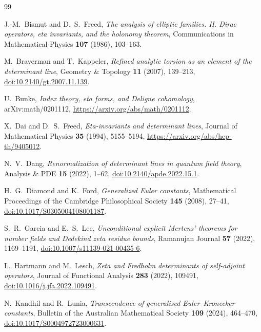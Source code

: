 \documentclass[11pt]{article}
\theoremstyle{definition}
\theoremstyle{remark}
\begin{document}
\begin{thebibliography}{99}

J.-M.~Bismut and D.~S.~Freed,
\emph{The analysis of elliptic families. II. Dirac operators, eta invariants, and the holonomy
theorem},
Communications in Mathematical Physics \textbf{107} (1986), 103--163.

M.~Braverman and T.~Kappeler,
\emph{Refined analytic torsion as an element of the determinant line},
Geometry \& Topology \textbf{11} (2007), 139--213,
\href{https://doi.org/10.2140/gt.2007.11.139}{doi:10.2140/gt.2007.11.139}.

U.~Bunke,
\emph{Index theory, eta forms, and Deligne cohomology},
arXiv:math/0201112,
\url{https://arxiv.org/abs/math/0201112}.

X.~Dai and D.~S.~Freed,
\emph{Eta-invariants and determinant lines},
Journal of Mathematical Physics \textbf{35} (1994), 5155--5194,
\url{https://arxiv.org/abs/hep-th/9405012}.

N.~V.~Dang,
\emph{Renormalization of determinant lines in quantum field theory},
Analysis \& PDE \textbf{15} (2022), 1--62,
\href{https://doi.org/10.2140/apde.2022.15.1}{doi:10.2140/apde.2022.15.1}.

H.~G.~Diamond and K.~Ford,
\emph{Generalized Euler constants},
Mathematical Proceedings of the Cambridge Philosophical Society \textbf{145} (2008), 27--41,
\href{https://doi.org/10.1017/S0305004108001187}{doi:10.1017/S0305004108001187}.

S.~R.~Garcia and E.~S.~Lee,
\emph{Unconditional explicit Mertens' theorems for number fields and Dedekind zeta residue bounds},
Ramanujan Journal \textbf{57} (2022), 1169--1191,
\href{https://doi.org/10.1007/s11139-021-00435-6}{doi:10.1007/s11139-021-00435-6}.

L.~Hartmann and M.~Lesch,
\emph{Zeta and Fredholm determinants of self-adjoint operators},
Journal of Functional Analysis \textbf{283} (2022), 109491,
\href{https://doi.org/10.1016/j.jfa.2022.109491}{doi:10.1016/j.jfa.2022.109491}.

N.~Kandhil and R.~Lunia,
\emph{Transcendence of generalised Euler--Kronecker constants},
Bulletin of the Australian Mathematical Society \textbf{109} (2024), 464--470,
\href{https://doi.org/10.1017/S0004972723000631}{doi:10.1017/S0004972723000631}.


\end{thebibliography}
\end{document}
